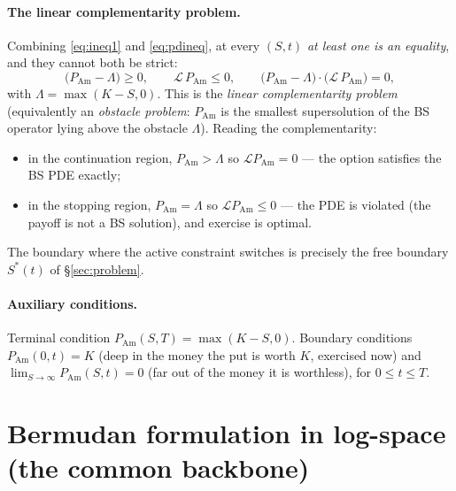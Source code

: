 \documentclass[11pt]{article}
\begin{document}
\paragraph{The linear complementarity problem.} Combining \eqref{eq:ineq1} and \eqref{eq:pdineq}, at every
$(S,t)$ \emph{at least one is an equality}, and they cannot both be strict:
\begin{equation}\label{eq:lcp}
\boxed{\;
\big(P_{\mathrm{Am}}-\Lambda\big)\ge0,\qquad
\mathcal L\,P_{\mathrm{Am}}\le0,\qquad
\big(P_{\mathrm{Am}}-\Lambda\big)\cdot\big(\mathcal L\,P_{\mathrm{Am}}\big)=0,
\;}
\end{equation}
with $\Lambda=\max(K-S,0)$. This is the \emph{linear complementarity problem} (equivalently an \emph{obstacle
problem}: $P_{\mathrm{Am}}$ is the smallest supersolution of the BS operator lying above the obstacle
$\Lambda$). Reading the complementarity:
\begin{itemize}[leftmargin=*]
  \item in the continuation region, $P_{\mathrm{Am}}>\Lambda$ so $\mathcal L P_{\mathrm{Am}}=0$ --- the option
  satisfies the BS PDE exactly;
  \item in the stopping region, $P_{\mathrm{Am}}=\Lambda$ so $\mathcal L P_{\mathrm{Am}}\le0$ --- the PDE is
  violated (the payoff is not a BS solution), and exercise is optimal.
\end{itemize}
The boundary where the active constraint switches is precisely the free boundary $S^\ast(t)$ of
\S\ref{sec:problem}.

\paragraph{Auxiliary conditions.} Terminal condition $P_{\mathrm{Am}}(S,T)=\max(K-S,0)$. Boundary conditions
$P_{\mathrm{Am}}(0,t)=K$ (deep in the money the put is worth $K$, exercised now) and
$\lim_{S\to\infty}P_{\mathrm{Am}}(S,t)=0$ (far out of the money it is worthless), for $0\le t\le T$.

\section{Bermudan formulation in log-space (the common backbone)}\label{sec:bermudan}
\end{document}
